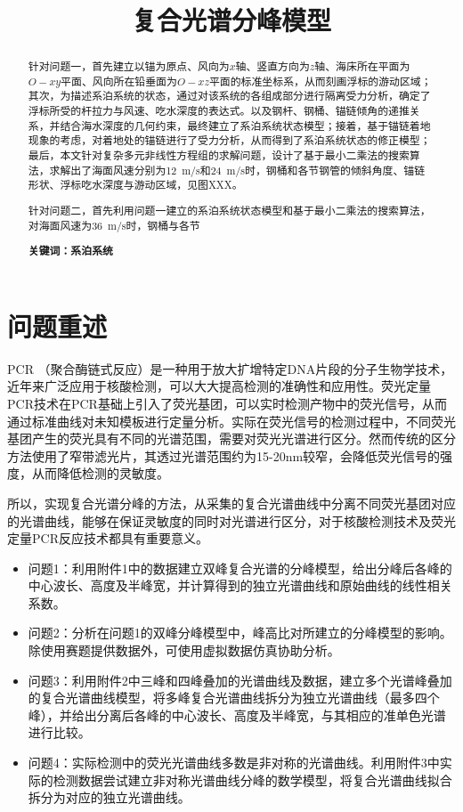\documentclass{article}
\date{}
\title{\heiti 复合光谱分峰模型}
\numberwithin{equation}{subsection}
\begin{document}
\maketitle
\begin{abstract}


针对问题一，首先建立以锚为原点、风向为$x$轴、竖直方向为$z$轴、海床所在平面为$O-xy$平面、风向所在铅垂面为$O-xz$平面的标准坐标系，从而刻画浮标的游动区域；其次，为描述系泊系统的状态，通过对该系统的各组成部分进行隔离受力分析，确定了浮标所受的杆拉力与风速、吃水深度的表达式。以及钢杆、钢桶、锚链倾角的递推关系，并结合海水深度的几何约束，最终建立了系泊系统状态模型；接着，基于锚链着地现象的考虑，对着地处的锚链进行了受力分析，从而得到了系泊系统状态的修正模型；最后，本文针对复杂多元非线性方程组的求解问题，设计了基于最小二乘法的搜索算法，求解出了海面风速分别为\SI{12}{m/s}和\SI{24}{m/s}时，钢桶和各节钢管的倾斜角度、锚链形状、浮标吃水深度与游动区域，见图XXX。

针对问题二，首先利用问题一建立的系泊系统状态模型和基于最小二乘法的搜索算法，对海面风速为\SI{36}{m/s}时，钢桶与各节
\\
\begin{flushleft}
\textbf{关键词：系泊系统}
\end{flushleft}
\end{abstract}


\newpage


\section{问题重述}


PCR （聚合酶链式反应）是一种用于放大扩增特定DNA片段的分子生物学技术，近年来广泛应用于核酸检测，可以大大提高检测的准确性和应用性。荧光定量PCR技术在PCR基础上引入了荧光基团，可以实时检测产物中的荧光信号，从而通过标准曲线对未知模板进行定量分析。实际在荧光信号的检测过程中，不同荧光基团产生的荧光具有不同的光谱范围，需要对荧光光谱进行区分。然而传统的区分方法使用了窄带滤光片，其透过光谱范围约为15-20nm较窄，会降低荧光信号的强度，从而降低检测的灵敏度。

所以，实现复合光谱分峰的方法，从采集的复合光谱曲线中分离不同荧光基团对应的光谱曲线，能够在保证灵敏度的同时对光谱进行区分，对于核酸检测技术及荧光定量PCR反应技术都具有重要意义。

\begin{itemize}
    \item 问题1：利用附件1中的数据建立双峰复合光谱的分峰模型，给出分峰后各峰的中心波长、高度及半峰宽，并计算得到的独立光谱曲线和原始曲线的线性相关系数。
    \item 问题2：分析在问题1的双峰分峰模型中，峰高比对所建立的分峰模型的影响。除使用赛题提供数据外，可使用虚拟数据仿真协助分析。
    \item 问题3：利用附件2中三峰和四峰叠加的光谱曲线及数据，建立多个光谱峰叠加的复合光谱曲线模型，将多峰复合光谱曲线拆分为独立光谱曲线（最多四个峰），并给出分离后各峰的中心波长、高度及半峰宽，与其相应的准单色光谱进行比较。
    \item 问题4：实际检测中的荧光光谱曲线多数是非对称的光谱曲线。利用附件3中实际的检测数据尝试建立非对称光谱曲线分峰的数学模型，将复合光谱曲线拟合拆分为对应的独立光谱曲线。
\end{itemize}
\end{document}

